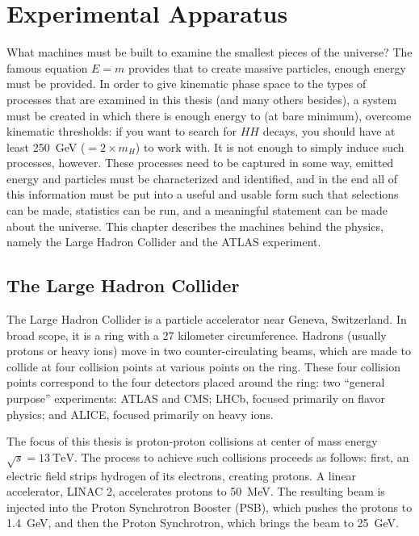 \chapter{Experimental Apparatus}
\label{chap:experiment}

What machines must be built to examine the smallest pieces of the universe? The famous equation 
$E = m$ provides that to create massive particles, enough energy must be provided. In order to give 
kinematic phase space to the types of processes that are examined in this thesis (and many others besides),
a system must be created in which there is enough energy to (at bare minimum), overcome kinematic thresholds:
if you want to search for $HH$ decays, you should have at least \SI{250}{\GeV} ($= 2\times m_{H}$) to work with.
It is not enough to simply induce such processes, however. These processes need to be captured in some way, emitted 
energy and particles must be characterized and identified, and in the end all of this information must be put into a 
useful and usable form such that selections can be made, statistics can be run, and a meaningful statement 
can be made about the universe. This chapter describes the machines behind the physics, namely the Large 
Hadron Collider and the ATLAS experiment.

\section{The Large Hadron Collider}
The Large Hadron Collider is a particle accelerator near Geneva, Switzerland. In broad scope, it is a 
ring with a 27 kilometer circumference. Hadrons (usually protons or heavy ions) move in two 
counter-circulating beams, which are made to collide at four collision points at various 
points on the ring. These four collision points correspond to the four detectors placed 
around the ring: two ``general purpose'' experiments: ATLAS and CMS; LHCb, focused primarily 
on flavor physics; and ALICE, focused primarily on heavy ions.

The focus of this thesis is proton-proton collisions at center of mass energy $\sqrt{s}=\SI{13}{\TeV}$. 
The process to achieve such collisions proceeds as follows:
first, an electric field strips hydrogen of its electrons, creating protons. A linear accelerator,
LINAC 2, accelerates protons to \SI{50}{\MeV}. The resulting beam is injected into the Proton 
Synchrotron Booster (PSB), which pushes the protons to \SI{1.4}{\GeV}, and then the Proton Synchrotron,
which brings the beam to \SI{25}{\GeV}.

